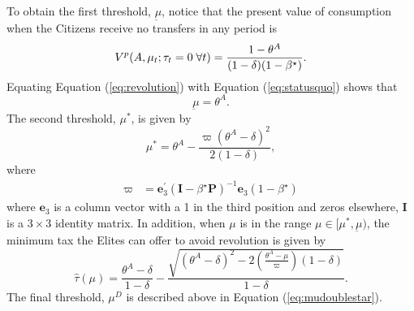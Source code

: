 \documentclass[12pt]{article}
\numberwithin{equation}{section}
\begin{document}
To obtain the first threshold, $\underbar{\ensuremath{\mu}}$, notice that the present value of consumption when the Citizens receive no transfers in any period is
\begin{equation}
V^{p}(A,\mu_{t}; \tau_t = 0 \; \forall t) =\frac{1-\theta^A}{(1-\delta)(1-\beta^{\star})}.\label{eq:statusquo} \\
\end{equation}
Equating Equation (\ref{eq:revolution}) with Equation (\ref{eq:statusquo}) shows that 
\begin{equation}
\underbar{\ensuremath{\mu}} = \theta^A.\label{eq:muunderbar}
\end{equation} 
The second threshold, $\mu^*$, is given by
\begin{equation}
\mu^* =\theta^A-\frac{\varpi(\theta^A-\delta)^2}{2(1-\delta)},\label{eq:mustar}
\end{equation}
where
\begin{align*}
\varpi & =  \mathbf{e}_3^\prime(\mathbf{I}-\beta^\star \mathbf{P})^{-1} \mathbf{e}_3(1-\beta^\star)
\end{align*}
where $\mathbf{e}_3$ is a column vector with a 1 in the third position and zeros elsewhere, $\mathbf{I}$ is a $3\times 3$ identity matrix.  In addition, when $\mu$ is in the range $\mu \in [\mu^{*},\underbar{\ensuremath{\mu}})$, the minimum tax the Elites can offer to avoid revolution is given by
\begin{equation}
\hat{\tau}(\mu) =\frac{\theta^A-\delta}{1-\delta} - \frac{\sqrt{\left(\theta^A-\delta\right)^2 - 2\left(\frac{\theta^A-\mu}{\varpi}\right)(1-\delta)}}{1-\delta}.\label{eq:mintax}
\end{equation}
The final threshold, $\mu^{D}$ is described above in Equation (\ref{eq:mudoublestar}).
\end{document}
